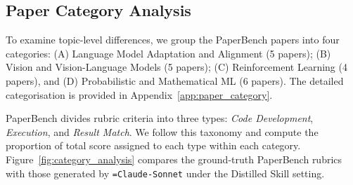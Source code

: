 \documentclass[11pt]{article}
\newcommand{\hyphentt}[1]{\texttt{\hyphenchar\font=\defaulthyphenchar #1}}
\begin{document}



\subsection{Paper Category Analysis}

To examine topic-level differences, we group the PaperBench papers into four categories: (A) Language Model Adaptation and Alignment (5 papers); (B) Vision and Vision-Language Models (5 papers); (C) Reinforcement Learning (4 papers), and (D) Probabilistic and Mathematical ML (6 papers). The detailed categorisation is provided in Appendix~\ref{app:paper_category}.

PaperBench divides rubric criteria into three types: \textit{Code Development}, \textit{Execution}, and \textit{Result Match}. We follow this taxonomy and compute the proportion of total score assigned to each type within each category. Figure~\ref{fig:category_analysis} compares the ground-truth PaperBench rubrics with those generated by \hyphentt{Claude-Sonnet} under the Distilled Skill setting.
\end{document}
